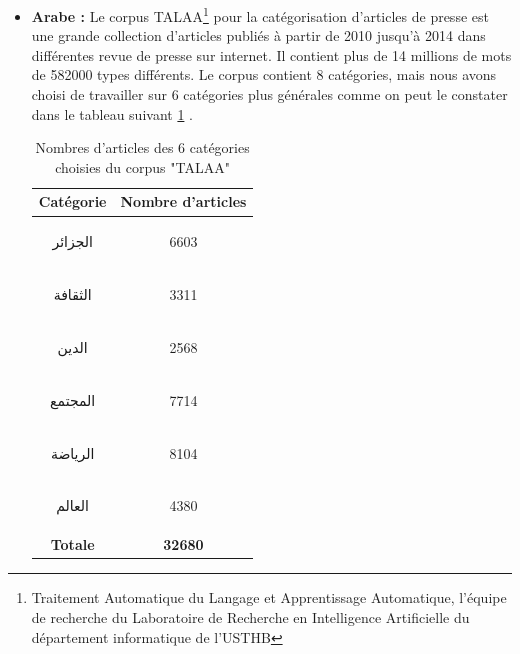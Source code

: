 \begin{itemize}
\begin{table}[H]
\begin{center}
                    \end{center}
                    \caption{Nombres d'articles de chaque catégorie du corpus "News"}
                    \label{news-categ}
                \end{table}
                \item{\textbf{Arabe : }}
                Le corpus TALAA\footnote{Traitement Automatique du Langage et Apprentissage Automatique, l'équipe de recherche du Laboratoire de Recherche en Intelligence Artificielle du département informatique de l'USTHB} pour la catégorisation d'articles de presse est une grande collection d'articles publiés à partir de 2010 jusqu'à 2014 dans différentes revue de presse sur internet. Il contient plus de 14 millions de mots de 582000 types différents. Le corpus contient 8 catégories, mais nous avons choisi de travailler sur 6 catégories plus générales comme on peut le constater dans le tableau suivant \ref{talaa-categ} \cite{talaa}. 
                \begin{table}[H]
                    \begin{center}
                        \begin{tabular}{|c|c|}
                            \hline
                            \textbf{Catégorie} &  \textbf{Nombre d'articles} \\
                            \hline
                            \begin{arab}الجزائر\end{arab} & 6603 \\
                            \hline
                            \begin{arab}الثقافة\end{arab} & 3311 \\
                            \hline
                            \begin{arab}الدين\end{arab} & 2568 \\
                            \hline
                            \begin{arab}المجتمع\end{arab} & 7714 \\
                            \hline
                            \begin{arab}الرياضة\end{arab} & 8104 \\
                            \hline
                            \begin{arab}العالم\end{arab} & 4380 \\
                            \hline
                            \textbf{Totale} & \textbf{32680} \\
                            \hline
                        \end{tabular}
                    \end{center}
                    \caption{Nombres d'articles des 6 catégories choisies du corpus "TALAA"}
                    \label{talaa-categ}
                \end{table}
            \end{itemize}
